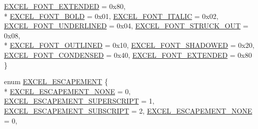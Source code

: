 \begin{DoxyCompactItemize}
\hyperlink{namespace_excel_format_a667f2d7917ef20f836e5cfec93751d05ac53f1f7b8da98ff92d4a8e91602f4d47}{E\+X\+C\+E\+L\+\_\+\+F\+O\+N\+T\+\_\+\+E\+X\+T\+E\+N\+D\+E\+D} = 0x80, 
\\*
\hyperlink{namespace_excel_format_a667f2d7917ef20f836e5cfec93751d05a1f34ef0f31a6ebb73a06f6d695cd2e8b}{E\+X\+C\+E\+L\+\_\+\+F\+O\+N\+T\+\_\+\+B\+O\+L\+D} = 0x01, 
\hyperlink{namespace_excel_format_a667f2d7917ef20f836e5cfec93751d05a208e5889a82ee1425d5fe66e8bb5f461}{E\+X\+C\+E\+L\+\_\+\+F\+O\+N\+T\+\_\+\+I\+T\+A\+L\+I\+C} = 0x02, 
\hyperlink{namespace_excel_format_a667f2d7917ef20f836e5cfec93751d05a52b83a79ad5a54b662cf30637d7180e9}{E\+X\+C\+E\+L\+\_\+\+F\+O\+N\+T\+\_\+\+U\+N\+D\+E\+R\+L\+I\+N\+E\+D} = 0x04, 
\hyperlink{namespace_excel_format_a667f2d7917ef20f836e5cfec93751d05abd9a8e7fe4e36df1fbd74221f52dbc77}{E\+X\+C\+E\+L\+\_\+\+F\+O\+N\+T\+\_\+\+S\+T\+R\+U\+C\+K\+\_\+\+O\+U\+T} = 0x08, 
\\*
\hyperlink{namespace_excel_format_a667f2d7917ef20f836e5cfec93751d05a2593d75f9c88ca21078192e3bb449d5e}{E\+X\+C\+E\+L\+\_\+\+F\+O\+N\+T\+\_\+\+O\+U\+T\+L\+I\+N\+E\+D} = 0x10, 
\hyperlink{namespace_excel_format_a667f2d7917ef20f836e5cfec93751d05a04f9f154a8b707dc0549db13a4078ec4}{E\+X\+C\+E\+L\+\_\+\+F\+O\+N\+T\+\_\+\+S\+H\+A\+D\+O\+W\+E\+D} = 0x20, 
\hyperlink{namespace_excel_format_a667f2d7917ef20f836e5cfec93751d05a9b5828572d3fdc91a6a4a91789c32602}{E\+X\+C\+E\+L\+\_\+\+F\+O\+N\+T\+\_\+\+C\+O\+N\+D\+E\+N\+S\+E\+D} = 0x40, 
\hyperlink{namespace_excel_format_a667f2d7917ef20f836e5cfec93751d05ac53f1f7b8da98ff92d4a8e91602f4d47}{E\+X\+C\+E\+L\+\_\+\+F\+O\+N\+T\+\_\+\+E\+X\+T\+E\+N\+D\+E\+D} = 0x80
 \}
\item 
enum \hyperlink{namespace_excel_format_a416dbaab3e15b5771ae63a846985407c}{E\+X\+C\+E\+L\+\_\+\+E\+S\+C\+A\+P\+E\+M\+E\+N\+T} \{ \\*
\hyperlink{namespace_excel_format_a416dbaab3e15b5771ae63a846985407ca23fa04d3acf1a8b11238451821947a67}{E\+X\+C\+E\+L\+\_\+\+E\+S\+C\+A\+P\+E\+M\+E\+N\+T\+\_\+\+N\+O\+N\+E} = 0, 
\hyperlink{namespace_excel_format_a416dbaab3e15b5771ae63a846985407ca056e291d587c717a82bdbdc2b030be41}{E\+X\+C\+E\+L\+\_\+\+E\+S\+C\+A\+P\+E\+M\+E\+N\+T\+\_\+\+S\+U\+P\+E\+R\+S\+C\+R\+I\+P\+T} = 1, 
\hyperlink{namespace_excel_format_a416dbaab3e15b5771ae63a846985407ca7328578cb7e58b42577bb67bf4a929b4}{E\+X\+C\+E\+L\+\_\+\+E\+S\+C\+A\+P\+E\+M\+E\+N\+T\+\_\+\+S\+U\+B\+S\+C\+R\+I\+P\+T} = 2, 
\hyperlink{namespace_excel_format_a416dbaab3e15b5771ae63a846985407ca23fa04d3acf1a8b11238451821947a67}{E\+X\+C\+E\+L\+\_\+\+E\+S\+C\+A\+P\+E\+M\+E\+N\+T\+\_\+\+N\+O\+N\+E} = 0, 

\end{DoxyCompactItemize}
